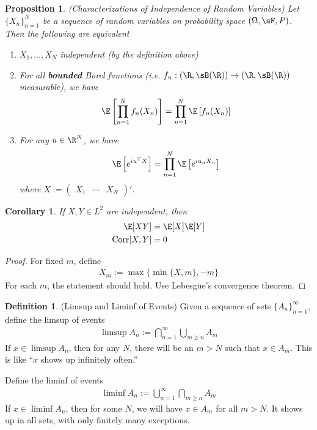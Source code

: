 \documentclass[12pt]{article}
\theoremstyle{plain}
\newtheorem{prop}[thm]{Proposition}
\newtheorem{cor}[thm]{Corollary}
\theoremstyle{definition}
\newtheorem{defn}[thm]{Definition}
\theoremstyle{remark}
\newcommand{\ra}{\rightarrow}
\newcommand{\Corr}{\operatorname{Corr}}
\newcommand{\ninf}{_{n=1}^\infty}
\newcommand{\nN}{_{n=1}^N}
\begin{document}
\begin{prop}\emph{(Characterizations of Independence of Random Variables)}
Let $\{X_n\}\nN$ be a sequence of random variables on probability space
$(\Omega,\sF,P)$. Then the following are equivalent
\begin{enumerate}
  \item $X_1,\ldots,X_N$ independent (by the definition above)
  \item For all \textbf{bounded} Borel functions (i.e.
    $f_n:(\R,\sB(\R)) \ra (\R,\sB(\R))$ measurable), we have
    \begin{align*}
      \E\left[\prod\nN f_n(X_n)\right]
      =
      \prod\nN \E\left[f_n(X_n)\right]
    \end{align*}
  \item For any $u\in \R^N$, we have
    \begin{align*}
      \E\left[e^{iu^T X}\right]
      =
      \prod\nN \E\left[e^{iu_n X_n}\right]
    \end{align*}
    where $X := \begin{pmatrix} X_1 &\cdots & X_N \end{pmatrix}'$.
\end{enumerate}
\end{prop}
\begin{cor}
If $X,Y\in L^2$ are independent, then
\begin{align*}
  \E[XY] &= \E[X]\E[Y] \\
  \Corr[X,Y] &= 0
\end{align*}
\end{cor}
\begin{proof}
For fixed $m$, define
\begin{align*}
  X_m := \max\{\min\{X,m\}, -m\}
\end{align*}
For each $m$, the statement should hold. Use Lebesgue's convergence
theorem.
\end{proof}

\begin{defn}(Limsup and Liminf of Events)
Given a sequence of sets $\{A_n\}\ninf$, define the limsup of events
\begin{align*}
  \limsup A_n := \bigcap\ninf \bigcup_{m \geq n} A_m
\end{align*}
If $x\in \limsup A_n$, then for any $N$, there will be an $m>N$ such
that $x\in A_m$. This is like ``$x$ shows up infinitely often.''

Define the liminf of events
\begin{align*}
  \liminf A_n := \bigcup\ninf \bigcap_{m \geq n} A_m
\end{align*}
If $x\in \liminf A_n$, then for some $N$, we will have $x\in A_m$ for
all $m > N$. It shows up in all sets, with only finitely many
exceptions.
\end{defn}
\end{document}
